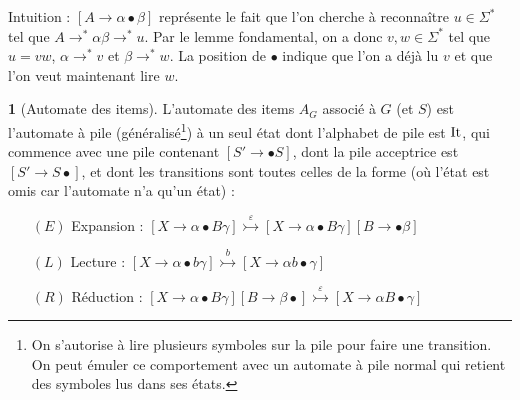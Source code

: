\documentclass[11pt,a4paper]{article}
\theoremstyle{plain}
\theoremstyle{definition}
\newtheorem{defn}[thm]{\protect\definitionname}
\theoremstyle{definition}
\theoremstyle{remark}
\theoremstyle{remark}
\theoremstyle{plain}
\theoremstyle{plain}
\theoremstyle{plain}
\theoremstyle{remark}
\providecommand{\definitionname}{Définition}
\begin{document}
Intuition : $\left[A\to\alpha\bullet\beta\right]$ représente le fait
que l'on cherche à reconnaître $u\in\Sigma^{*}$ tel que $A\to^{*}\alpha\beta\to^{*}u$.
Par le lemme fondamental, on a donc $v,w\in\Sigma^{*}$ tel que $u=vw$,
$\alpha\to^{*}v$ et $\beta\to^{*}w$. La position de $\bullet$ indique
que l'on a déjà lu $v$ et que l'on veut maintenant lire $w$.
\begin{defn}[Automate des items]
	
	L'automate des items $A_{G}$ associé à $G$ (et $S$) est l'automate
	à pile (généralisé\footnote{On s'autorise à lire plusieurs symboles sur la pile pour faire une transition. On peut émuler ce comportement avec un automate à pile normal qui retient des symboles lus dans ses états.}) à un seul état dont l'alphabet de pile est $\operatorname{It}$,
	qui commence avec une pile contenant $\left[S'\to\bullet S\right]$,
	dont la pile \og acceptrice \fg{} est $\left[S'\to S\bullet\right]$,
	et dont les transitions sont toutes celles de la forme (où l'état
	est omis car l'automate n'a qu'un état) :
	\begin{itemize}
		\item[$(E)$]  \og Expansion \fg{} : $\left[X\to\alpha\bullet B\gamma\right]\overset{\varepsilon}{\rightarrowtail}\left[X\to\alpha\bullet B\gamma\right]\left[B\to\bullet\beta\right]$
		\item[$(L)$]  \og Lecture \fg{} : $\left[X\to\alpha\bullet b\gamma\right]\overset{b}{\rightarrowtail}\left[X\to\alpha b\bullet\gamma\right]$
		\item[$(R)$]  \og Réduction \fg{} : $\left[X\to\alpha\bullet B\gamma\right]\left[B\to\beta\bullet\right]\overset{\varepsilon}{\rightarrowtail}\left[X\to\alpha B\bullet\gamma\right]$ 
	\end{itemize}
\end{defn}
\end{document}
